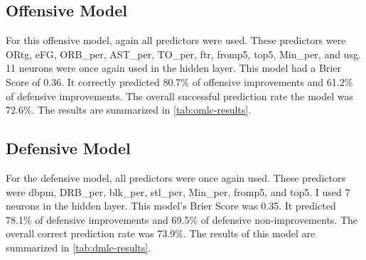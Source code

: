 \documentclass[12pt]{article}
\begin{document}
\subsection{Offensive Model}
\label{subsec:omlc}
For this offensive model, again all predictors were used. These predictors were ORtg, eFG, ORB\_per, AST\_per, TO\_per, ftr, fromp5, top5, Min\_per, and usg. 11 neurons were once again used in the hidden layer. This model had a Brier Score of 0.36. It correctly predicted 80.7\% of offensive improvements and 61.2\% of defensive improvements. The overall successful prediction rate the model was 72.6\%. The results are summarized in \autoref{tab:omlc-results}.

\begin{table}[t]
\centering
{}
\caption{Offensive Neural Network Classification Model Evaluators}
\label{tab:omlc-results}
\end{table}

\subsection{Defensive Model}
\label{subsec:dmlc}
For the defensive model, all predictors were once again used. These predictors were dbpm, DRB\_per, blk\_per, stl\_per, Min\_per, fromp5, and top5. I used 7 neurons in the hidden layer. This model's Brier Score was 0.35. It predicted 78.1\% of defensive improvements and 69.5\% of defensive non-improvements. The overall correct prediction rate was 73.9\%. The results of this model are summarized in \autoref{tab:dmlc-results}. 

\begin{table}[t]
\centering
{}
\caption{Defensive Neural Network Classification Model Evaluators}
\label{tab:dmlc-results}
\end{table}
\end{document}
